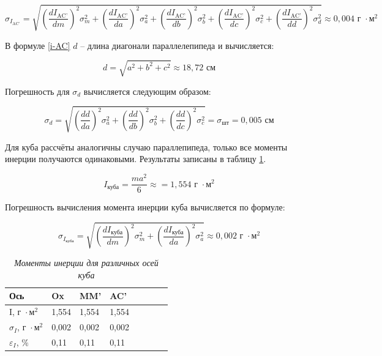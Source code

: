 \documentclass[a4paper,12pt]{article}
\begin{document}
\begin{equation}\label{i-AC}
    \sigma_{I_{\text{AC'}}} = \sqrt{
    \left( \frac{dI_{\text{AC'}}}{dm} \right)^2 \sigma_{m}^2 + 
    \left( \frac{dI_{\text{AC'}}}{da} \right)^2 \sigma_{a}^2 + 
    \left( \frac{dI_{\text{AC'}}}{db} \right)^2 \sigma_{b}^2 + 
    \left( \frac{dI_{\text{AC'}}}{dc} \right)^2 \sigma_{c}^2 +
    \left( \frac{dI_{\text{AC'}}}{dd} \right)^2 \sigma_{d}^2
    } \approx 0,004 \text{ г } \cdot \text{м}^2
\end{equation}

В формуле \eqref{i-AC} $d$ -- длина диагонали параллелепипеда и вычисляется:

\begin{equation}
    d = \sqrt{a^2 + b^2 + c^2} \approx 18,72 \text{ см}
\end{equation}

 Погрешность для $\sigma_{d}$ вычисляется следующим образом:

\begin{equation}
    \sigma_{d} = \sqrt{
    \left( \frac{dd}{da} \right)^2 \sigma_{a}^2 + 
    \left( \frac{dd}{db} \right)^2 \sigma_{b}^2 + 
    \left( \frac{dd}{dc} \right)^2 \sigma_{c}^2
    } = \sigma_{\text{шт}} = 0,005 \text{ см}
\end{equation}

Для куба рассчёты аналогичны случаю параллепипеда, только все моменты инерции получаются одинаковыми. Результаты записаны в таблицу \ref{cube-i}.

\begin{equation}
    I_{\text{куба}} = \frac{ma^2}{6} \approx = 1,554 \text{ г } \cdot \text{м}^2
\end{equation}

Погрешность вычисления момента инерции куба вычисляется по формуле:

\begin{equation}
    \sigma_{I_{\text{куба}}} = \sqrt{
    \left( \frac{dI_{\text{куба}}}{dm} \right)^2 \sigma_{m}^2 + 
    \left( \frac{dI_{\text{куба}}}{da} \right)^2 \sigma_{a}^2
    } \approx 0,002 \text{ г } \cdot \text{м}^2
\end{equation}

\begin{table}[!ht]
    \centering
    \begin{tabular}{|l|l|l|l|l|l|l|l|}
    \hline
        Ось & Ox & MM' & AC' \\ \hline
        I, $\text{г } \cdot \text{м}^2$ & 1,554 & 1,554 & 1,554 \\ \hline
        $\sigma_{I}$, $\text{г } \cdot \text{м}^2$ & 0,002 & 0,002 & 0,002 \\ \hline
        $\varepsilon_{I}$, $\%$ & 0,11 & 0,11 & 0,11 \\ \hline
    \end{tabular}\caption{\textit{Моменты инерции для различных осей куба}}\label{cube-i}
\end{table}
\end{document}
